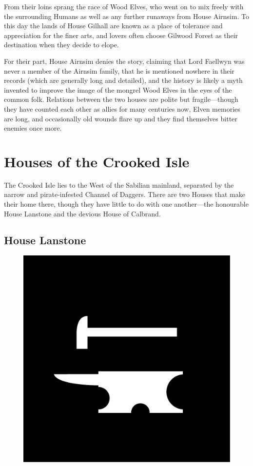 \documentclass[10pt,twoside,openright,a4paper,twocolumn]{book}
\begin{document}
From their loins sprang the race of Wood Elves, who went on to mix freely with
the surrounding Humans as well as any further runaways from House Airnsim.  To
this day the lands of House Gilhall are known as a place of tolerance and
appreciation for the finer arts, and lovers often choose Gilwood Forest as
their destination when they decide to elope.

For their part, House Airnsim denies the story, claiming that Lord Faellwyn was
never a member of the Airnsim family, that he is mentioned nowhere in their
records (which are generally long and detailed), and the history is likely a
myth invented to improve the image of the mongrel Wood Elves in the eyes of the
common folk.  Relations between the two houses are polite but fragile---though
they have counted each other as allies for many centuries now, Elven memories
are long, and occasionally old wounds flare up and they find themselves bitter
enemies once more.

\section{Houses of the Crooked Isle}

The Crooked Isle lies to the West of the Sabilian mainland, separated by the
narrow and pirate-infested Channel of Daggers.  There are two Houses that make
their home there, though they have little to do with one another---the
honourable House Lanstone and the devious House of Calbrand.

\subsection*{House Lanstone}

\begin{figure}
  \includegraphics[width=0.48\columnwidth]{images/HouseLanstone}
\end{figure}
\end{document}
